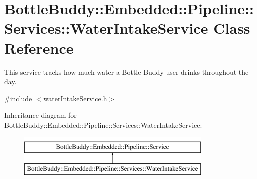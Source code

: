 \hypertarget{class_bottle_buddy_1_1_embedded_1_1_pipeline_1_1_services_1_1_water_intake_service}{}\section{Bottle\+Buddy\+:\+:Embedded\+:\+:Pipeline\+:\+:Services\+:\+:Water\+Intake\+Service Class Reference}
\label{class_bottle_buddy_1_1_embedded_1_1_pipeline_1_1_services_1_1_water_intake_service}


This service tracks how much water a Bottle Buddy user drinks throughout the day.  




{\ttfamily \#include $<$water\+Intake\+Service.\+h$>$}

Inheritance diagram for Bottle\+Buddy\+:\+:Embedded\+:\+:Pipeline\+:\+:Services\+:\+:Water\+Intake\+Service\+:\begin{figure}[H]
\begin{center}
\leavevmode
\includegraphics[height=2.000000cm]{class_bottle_buddy_1_1_embedded_1_1_pipeline_1_1_services_1_1_water_intake_service}
\end{center}
\end{figure}
